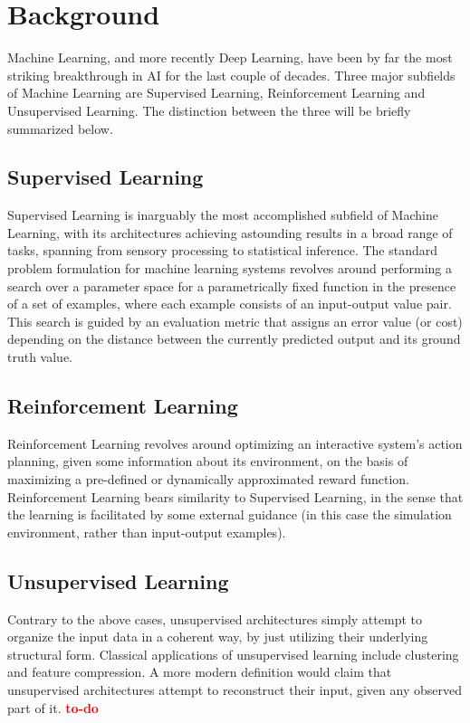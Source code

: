 \documentclass[]{article}
\newcommand\todo{\textcolor{red}{\bf{to-do}}}
\begin{document}
\section{Background}\label{sec:Background}

Machine Learning, and more recently Deep Learning, have been by far the most striking breakthrough in AI for the last couple of decades. Three major subfields of Machine Learning are Supervised Learning, Reinforcement Learning and Unsupervised Learning. The distinction between the three will be briefly summarized below.

\subsection{Supervised Learning}
Supervised Learning is inarguably the most accomplished subfield of Machine Learning, with its architectures achieving astounding results in a broad range of tasks, spanning from sensory processing to statistical inference. The standard problem formulation for machine learning systems revolves around performing a search over a parameter space for a parametrically fixed function in the presence of a set of examples, where each example consists of an input-output value pair. This search is guided by an evaluation metric that assigns an error value (or cost) depending on the distance between the currently predicted output and its ground truth value.

\subsection{Reinforcement Learning}
Reinforcement Learning revolves around optimizing an interactive system's action planning, given some information about its environment, on the basis of maximizing a pre-defined or dynamically approximated reward function. Reinforcement Learning bears similarity to Supervised Learning, in the sense that the learning is facilitated by some external guidance (in this case the simulation environment, rather than input-output examples).

\subsection{Unsupervised Learning}
Contrary to the above cases, unsupervised architectures simply attempt to organize the input data in a coherent way, by just utilizing their underlying structural form. Classical applications of unsupervised learning include clustering and feature compression. A more modern definition would claim that unsupervised architectures attempt to reconstruct their input, given any observed part of it. {\todo{}}
\end{document}
